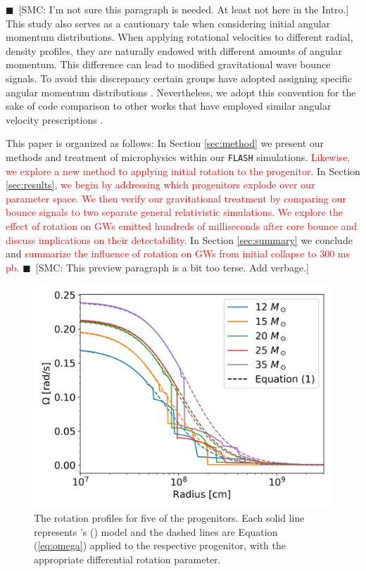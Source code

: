 \documentclass[twocolumn,times]{aastex62}  %
\newcommand{\smc}[1]{{\color{blue}$\blacksquare$~\textsf{[SMC: #1]}}}
\begin{document}
\smc{I'm not sure this paragraph is needed. At least not here in the Intro.} This study also serves as a cautionary tale when considering initial angular momentum distributions.  When applying rotational velocities to different radial, density profiles, they are naturally endowed with different amounts of angular momentum.  This difference can lead to modified gravitational wave bounce signals.    To avoid this discrepancy certain groups have adopted assigning specific angular momentum distributions \citep[eg.][]{oconnor:2011}.  Nevertheless, we adopt this convention for the sake of code comparison to other works that have employed similar angular velocity prescriptions \citep{richers:2017}.


This paper is organized as follows:  In Section \ref{sec:method} we present our methods and treatment of microphysics within our \texttt{FLASH} simulations.  \textcolor{red}{Likewise, we explore a new method to applying initial rotation to the progenitor.}  In Section \ref{sec:results}, \textcolor{red}{we begin by addressing which progenitors explode over our parameter space.  We then verify our gravitational treatment by comparing our bounce signals to two separate general relativistic simulations.  We explore the effect of rotation on GWs emitted hundreds of milliseconds after core bounce and discuss implications on their detectability.}  In Section \ref{sec:summary} we conclude and \textcolor{red}{summarize the influence of rotation on GWs from initial collapse to 300 ms pb.} \smc{This preview paragraph is a bit too terse. Add verbage.}


\begin{figure}[t]
    \centering
    \includegraphics[scale=0.45]{figures/omega_vs_r_m12.png}
    \caption{The rotation profiles for five of the \citet{heger:2005} progenitors.  Each solid line represents \citeauthor{heger:2005}'s (\citeyear{heger:2005}) model and the dashed lines are Equation (\ref{eq:omega}) applied to the respective progenitor, with the appropriate differential rotation parameter.  }
    \label{fig:ovsr}
\end{figure}
\end{document}
